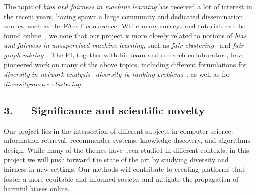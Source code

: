\documentclass[a4paper,11pt]{article}
\begin{document}

The topic of \emph{bias and fairness in machine learning} has received a lot of interest in the recent years, 
having spawn a large community and dedicated dissemination venues, such as the FAccT conference. 
While many surveys and tutorials can be found online~\cite{caton2020fairness,mehrabi2021survey}, 
we note that our project is more closely related to notions of
\emph{bias and fairness in unsupervised machine learning}, 
such as 
\emph{fair clustering}~\cite{chierichetti2017fair}
and \emph{fair graph mining}~\cite{dong2023fairness}.
%
The PI, together with his team and research collaborators, 
have pioneered work on many of the above topics,
including
different formulations for \emph{diversity in network analysis}~\cite{adriaens2023minimizing,cinus2023rebalancing,coupette2023reducing,oettershagen2024finding}
\emph{diversity in ranking problems}~\cite{zhang2022ranking}, 
as well as for \emph{diversity-aware clustering}~\cite{thejaswi2021diversity}.

\subsection*{3.~~~Significance and scientific novelty}



Our project lies in the intersection of different subjects in computer-science:
information retrieval, recommender systems, knowledge discovery, and algorithms design. 
While many of the themes have been studied in different contexts,
in this project we will push forward the state of the art 
by studying diversity and fairness in new settings.
Our methods will contribute to creating platforms that foster a more equitable and informed society, 
and mitigate the propagation of harmful biases online.
\end{document}
